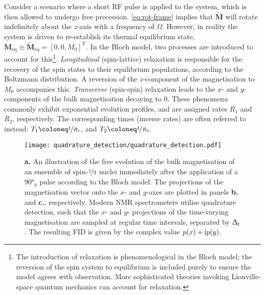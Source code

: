 Consider a scenario where a short \ac{RF} pulse is applied to the system, which
is then allowed to undergo free precession. \cref{eq:rot-frame} implies that
$\tilde{\symbf{M}}$ will rotate indefinitely about the $z$-axis with a
frequency of $\Omega$. However, in reality the system is driven to re-establish
its thermal equilibrium state, $\symbf{M}_{\text{eq}} \equiv
\tilde{\symbf{M}}_{\text{eq}} = [0, 0, M_0]^{\mathrm{T}}$. In the
Bloch model, two processes are introduced to account for this\footnote{
    The introduction of relaxation is phenomenological in the Bloch model; the
    reversion of the spin system to equilibrium is included purely to ensure
    the model agrees with observation. More sophisticated theories invoking
    Liouville-space quantum mechanics can account for
    relaxation\cite{Goldman2001,Kuprov2007}.
}. \emph{Longitudinal} (spin-lattice)
relaxation is responsible for the recovery of the spin states to their
equilibrium populations, according to the Boltzmann distribution. A reversion
of the $z$-component of the magnetisation to $M_0$ accompanies this.
\emph{Transverse} (spin-spin) relaxation leads to the $x$- and $y$-components
of the bulk magnetisation decaying to $0$. These phenomena commonly exhibit
exponential evolution profiles, and are assigned rates $R_1$ and $R_2$,
respectively. The corresponding times (inverse rates) are often referred to
instead:
$T_1 \coloneq \nicefrac{1}{R_1}$, and
$T_2 \coloneq \nicefrac{1}{R_2}$.
\begin{figure}
    \centering
    \texttt{[image: quadrature\_detection/quadrature\_detection.pdf]}
    \caption[
        An illustration of the free evolution of the bulk
        magnetisation of an ensemble of spin-$\nicefrac{1}{2}$ nuclei
        according to the Bloch model.
    ]{
        \textbf{a.} An illustration of the free evolution of the bulk
        magnetisation of an ensemble of spin-$\nicefrac{1}{2}$ nuclei
        immediately after the application of a $\ang{90}_y$ pulse according to
        the Bloch model.
        The projections of the magnetisation vector onto the
        $x$- and  $y$-axes are plotted in panels \textbf{b.} and \textbf{c.},
        respectively. Modern \acs{NMR} spectrometers utilise quadrature
        detection, such that the $x$- and  $y$- projections of the time-varying
        magnetisation are sampled at regular time intervals, separated by
        $\Updelta_t$.  The resulting \acs{FID} is given by the complex value $p(x) +
        \mathrm{i} p(y)$.
    }\label{fig:quadrature}
\end{figure}

